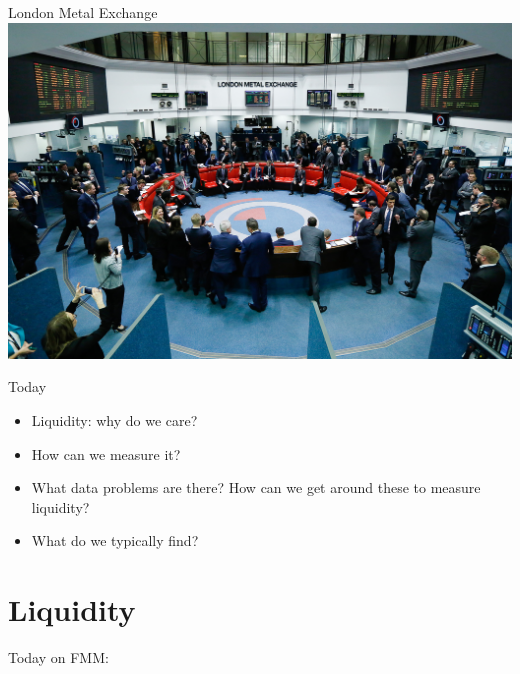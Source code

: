 \documentclass[english,10pt]{beamer}
\begin{document}
\begin{frame}{London Metal Exchange}
	\centering
	\includegraphics[scale=0.6]{pics/lme}
\end{frame}


\begin{frame}{Today}
	\begin{itemize}
		\item Liquidity: why do we care?
		\item How can we measure it?
		\item What data problems are there? How can we get around these to measure liquidity?
		\item What do we typically find?
	\end{itemize}
\end{frame}


\section{Liquidity}

\begin{frame}{Today on FMM:}
	\tableofcontents[currentsection]
\end{frame}
\end{document}
